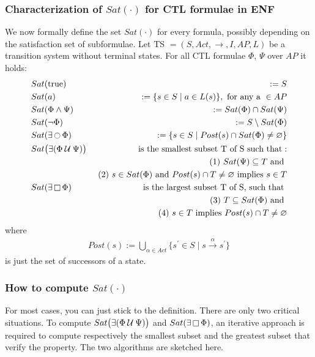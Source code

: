 \documentclass{article}
\begin{document}
\subsubsection*{Characterization of $Sat(\cdot)$ for CTL formulae in ENF}
We now formally define the set $Sat(\cdot)$ for every formula, possibly depending on the satisfaction set of subformulae. Let TS $ = (S, Act, \rightarrow, I, AP, L)$ be a transition system without terminal states. For all CTL formulae $\Phi$, $\Psi$ over $AP$ it holds:
\begin{eqnarray*}
    & Sat(\text{true})          & := S \\
    & Sat(a)                    & := \{ s \in S \mid a \in L(s) \}, \text{ for any a } \in AP \\ 
    & Sat( \Phi \land \Psi)     & := Sat(\Phi) \cap Sat(\Psi) \\ 
    & Sat(\neg \Phi)            & := S \setminus Sat(\Phi) \\ 
    & Sat(\exists \mathop{\ocircle}{\Phi}) & := \{ s \in S \mid Post(s) \cap Sat(\Phi) \neq \varnothing \}\\
    & Sat\big(\exists (\Phi \mathbin{\mathcal{U}} \Psi) \big) & \text{ is the smallest subset T of S such that}: \\
    && \text{ (1) } Sat(\Psi) \subseteq T \text{ and } \\
    && \text{ (2) } s \in Sat(\Phi) \text{ and } Post(s) \cap T \neq \varnothing \text{ implies } s \in T \\
    & Sat(\exists \mathop{\square} \Phi) & \text{is the largest subset T of S, such that }\\
    && \text{ (3) } T \subseteq Sat(\Phi) \text{ and } \\
    && \text{ (4) } s \in T \text{ implies } Post(s) \cap T \neq \varnothing \\
\end{eqnarray*}
where
\begin{align*}
    Post(s) := \bigcup_{\alpha \in Act} \{ s^{'} \in S \mid s \xrightarrow{\alpha} s^{'} \}
\end{align*}
is just the set of successors of a state.

\subsubsection{How to compute $Sat(\cdot)$}
For most cases, you can just stick to the definition. There are only two critical situations.
To compute $Sat\big(\exists (\Phi \mathbin{\mathcal{U}} \Psi) \big)$ and $Sat(\exists \mathop{\square} \Phi)$, an iterative approach is required to compute respectively the smallest subset and the greatest subset that verify the property. The two algorithms are sketched here.
\end{document}
